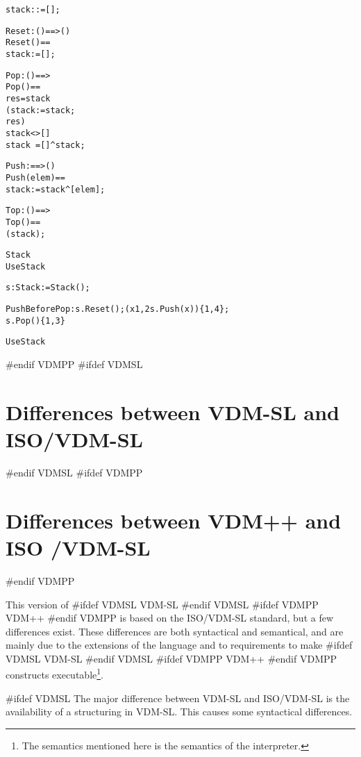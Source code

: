 \documentclass[\pformat,12pt]{article}
\newcommand{\vdmslpp}[2]{%
#ifdef VDMSL
#1
#endif VDMSL
#ifdef VDMPP
#2
#endif VDMPP
}
\newcommand{\vdmsl}{VDM-SL}
\newcommand{\vdmpp}{VDM++}
\begin{document}
\begin{description}
\begin{alltt}
    stack :  := [];


     Reset : () ==> ()
    Reset () ==
      stack := [];

     Pop : () ==> 
    Pop() ==
       res =  stack 
        (stack :=  stack;
          res)
     stack <> []
     stack~ = [] ^ stack;

     Push:  ==> ()
    Push(elem) ==
      stack := stack ^ [elem];

     Top : () ==> 
    Top() ==
       ( stack);

 Stack
 UseStack


  s : Stack :=  Stack();


  PushBeforePop : s.Reset(); ( x  {1,2}  s.Push(x))\{1,4\}; 
                  s.Pop()\{1,3\}
 
 UseStack
\end{alltt}
\end{description}

#endif VDMPP
#ifdef VDMSL
\section{Differences between  VDM-SL
         and\\      ISO/VDM-SL}\label{diff}
#endif VDMSL
#ifdef VDMPP
\section{Differences between  VDM++
         and ISO /VDM-SL}\label{diff}
#endif VDMPP

This version of  \vdmslpp{\vdmsl}{\vdmpp} is based on 
the ISO/VDM-SL standard, but a few differences exist. These
differences are both syntactical and semantical, and are mainly due to
the extensions of the language and to requirements to make 
\vdmslpp{\vdmsl}{\vdmpp} constructs executable\footnote{The semantics
mentioned here is the semantics of the interpreter.}.

#ifdef VDMSL
The major difference between  {\vdmsl} and
ISO/VDM-SL is the availability of a structuring in  VDM-SL. This
causes some syntactical differences.
\end{document}
